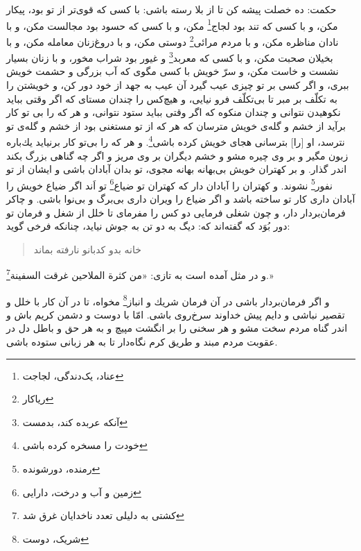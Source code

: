 حكمت: ده خصلت پيشه كن تا از بلا رسته باشى: با كسى كه قوى‌تر از تو بود، پيكار مكن، و با كسى كه تند بود لجاج\footnote{عناد، یک‌دندگی، لجاجت} مكن، و با كسى كه حسود بود مجالست مكن، و با نادان مناظره مكن، و با مردم مرائى\footnote{ریا‌کار} دوستى مكن، و با دروغ‌زنان معامله مكن، و با بخيلان صحبت مكن، و با كسى كه معربد\footnote{آنکه عربده کند، بدمست} و غيور بود شراب مخور، و با زنان بسيار نشست و خاست مكن، و سرّ خويش با كسى مگوى كه آب بزرگى و حشمت خويش ببرى، و اگر كسى بر تو چيزى عيب گيرد آن عيب به جهد از خود دور كن، و خويشتن را به تكلّف بر مبر تا بى‌تكلّف فرو نيايى، و هيچ‌كس را چندان مستاى كه اگر وقتى ببايد نكوهيدن نتوانى و چندان منكوه كه اگر وقتى ببايد ستود نتوانى، و هر كه را بى‌ تو كار برآيد از خشم و گله‌ی خويش مترسان كه هر كه از تو مستغنى بود از خشم و گله‌ی تو نترسد، او [را] بترسانى هجاى خويش كرده باشى\footnote{خودت را مسخره کرده باشی}. و هر كه را بى‌تو كار برنيايد يك‌باره زبون مگير و بر وى چيره مشو و خشم ديگران بر وى مريز و اگر چه گناهى بزرگ بكند اندر گذار. و بر كهتران خويش بى‌بهانه بهانه مجوى، تو بدان آبادان باشى و ايشان از تو نفور\footnote{رمنده، دورشونده} نشوند. و كهتران را آبادان دار كه كهتران تو ضياع\footnote{زمین و آب و درخت، دارایی} تو اَند اگر ضياع خويش را آبادان دارى كار تو ساخته باشد و اگر ضياع را ويران دارى بى‌برگ و بى‌نوا باشى. و چاكر فرمان‌بردار دار، و چون شغلى فرمايى دو كس را مفرماى تا خلل از شغل و فرمان تو دور بُوَد كه گفته‌اند كه: ديگ به دو تن به جوش نيايد، چنانكه فرخى گويد:

\begin{quote}
خانه بدو كدبانو نارفته بماند
\end{quote}

و در مثل آمده است به تازى: «من كثرة الملاحين غرقت السفينة\footnote{کشتی به دلیلی تعدد ناخدایان غرق شد}.»


و اگر فرمان‌بردار باشى در آن فرمان شريك و انباز\footnote{شریک، دوست} مخواه، تا در آن كار با خلل و تقصير نباشى و دايم پيش خداوند سرخ‌روى باشى. امّا با دوست و دشمن كريم باش و اندر گناه مردم سخت مشو و هر سخنى را بر انگشت مپيچ و به هر حق و باطل دل در عقوبت مردم مبند و طريق كرم نگاه‌دار تا به هر زبانى ستوده باشى.




\newpage
\newpage
























